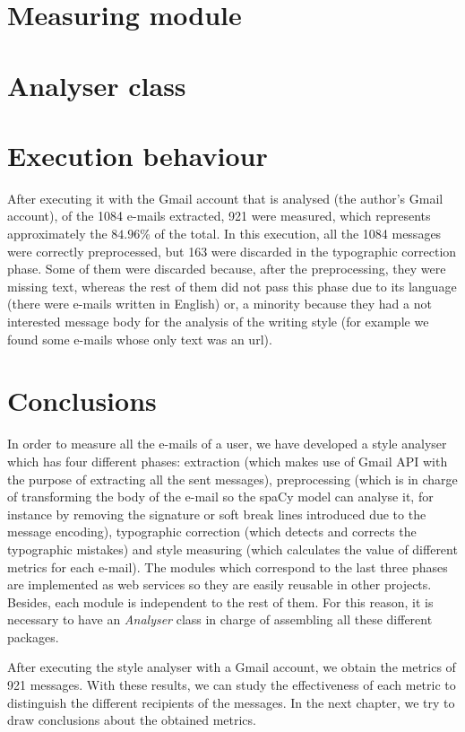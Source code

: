\section{Measuring module} \label{section:measmod}


\section{Analyser class}\label{sect:analyserclass}


\section{Execution behaviour} \label{section:exebehav}
After executing it with the Gmail account that is analysed (the author's Gmail account), of the 1084 e-mails extracted, 921 were measured, which represents approximately the $84.96$\% of the total. In this execution, all the 1084 messages were correctly preprocessed, but 163 were discarded in the typographic correction phase. Some of them were discarded because, after the preprocessing, they were missing text, whereas the rest of them did not pass this phase due to its language (there were e-mails written in English) or, a minority because they had a not interested message body for the analysis of the writing style (for example we found some e-mails whose only text was an url).

\section{Conclusions}
In order to measure all the e-mails of a user, we have developed a style analyser which has four different phases: extraction (which makes use of Gmail API with the purpose of extracting all the sent messages), preprocessing (which is in charge of transforming the body of the e-mail so the spaCy model can analyse it, for instance by removing the signature or soft break lines introduced due to the message encoding), typographic correction (which detects and corrects the typographic mistakes) and style measuring (which calculates the value of different metrics for each e-mail). The modules which correspond to the last three phases are implemented as web services so they are easily reusable in other projects. Besides, each module is independent to the rest of them. For this reason, it is necessary to have an \textit{Analyser} class in charge of assembling all these different packages.

After executing the style analyser with a Gmail account, we obtain the metrics of 921 messages. With these results, we can study the effectiveness of each metric to distinguish the different recipients of the messages. In the next chapter, we try to draw conclusions about the obtained metrics.